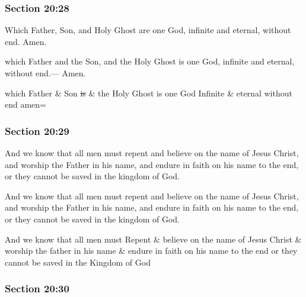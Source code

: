 	\subsubsection{Section 20:28} %
		\label{DC20-28}

		Which Father, Son, and Holy Ghost are one God, infinite and eternal, without end. Amen.

		\begin{framed}
		\scriptsize
			\begin{compactdesc}
				\item[JSP] which Father and the Son, and the Holy Ghost is one God, infinite and eternal, without end.--- Amen.
				\item[RB1] which Father \& Son \sout{is} \& the Holy Ghost is one God Infinite \& eternal without end amen=
			\end{compactdesc}
		\end{framed}

	\subsubsection{Section 20:29} %
		\label{DC20-29}

		And we know that all men must repent and believe on the name of Jesus Christ, and worship the Father in his name, and endure in faith on his name to the end, or they cannot be saved in the kingdom of God.

		\begin{framed}
		\scriptsize
			\begin{compactdesc}
				\item[JSP] And we know that all men must repent and believe on the name of Jesus Christ, and worship the Father in his name, and endure in faith on his name to the end, or they cannot be saved in the kingdom of God.
				\item[RB1] And we know that all men must Repent \& believe on the name of Jesus Christ \& worship the father in his name \& endure in faith on his name to the end or they cannot be saved in the Kingdom of God
			\end{compactdesc}
		\end{framed}

	\subsubsection{Section 20:30} %
		\label{DC20-30}


